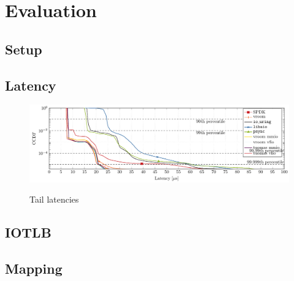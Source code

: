 \chapter{Evaluation}

\section{Setup}

\section{Latency}
\begin{figure}
    \centering
     {\includegraphics[width=\textwidth]{figures/latency-ccdf-write} \label{fig:ccdf-write}}
    \caption{Tail latencies}
    \label{fig:ccdf}
\end{figure}

\section{IOTLB}
\section{Mapping}